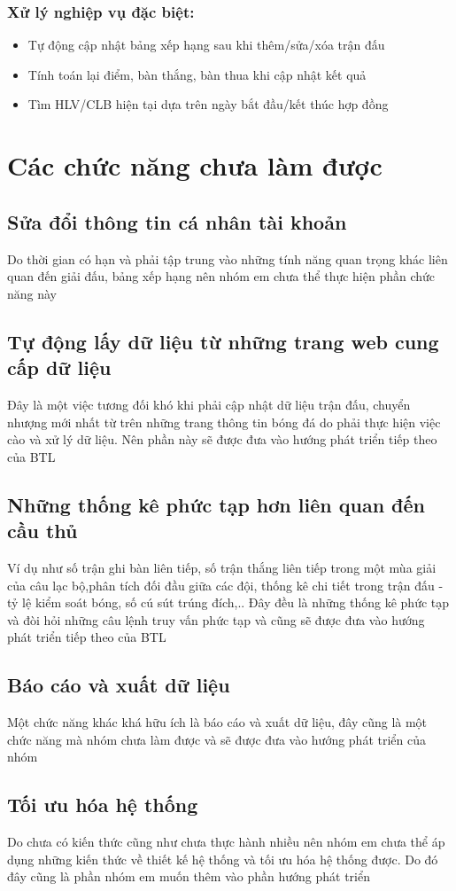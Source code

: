 \documentclass[../BTL.tex]{subfiles}
\begin{document}
\subsubsection{Xử lý nghiệp vụ đặc biệt:}
\begin{itemize}
    \item Tự động cập nhật bảng xếp hạng sau khi thêm/sửa/xóa trận đấu
    \item Tính toán lại điểm, bàn thắng, bàn thua khi cập nhật kết quả
    \item Tìm HLV/CLB hiện tại dựa trên ngày bắt đầu/kết thúc hợp đồng
\end{itemize}
\section{Các chức năng chưa làm được}
\subsection{Sửa đổi thông tin cá nhân tài khoản}
Do thời gian có hạn và phải tập trung vào những tính năng quan trọng khác liên quan đến giải đấu, bảng xếp hạng nên nhóm em chưa thể thực hiện phần chức năng này

\subsection{ Tự động lấy dữ liệu từ những trang web cung cấp dữ liệu}
Đây là một việc tương đối khó khi phải cập nhật dữ liệu trận đấu, chuyển nhượng mới nhất từ trên những trang thông tin bóng đá do phải thực hiện việc cào và xử lý dữ liệu. Nên phần này sẽ được đưa vào hướng phát triển tiếp theo của BTL

\subsection{ Những thống kê phức tạp hơn liên quan đến cầu thủ}
Ví dụ như số trận ghi bàn liên tiếp, số trận thắng liên tiếp trong một mùa giải của câu lạc bộ,phân tích đối đầu giữa các đội, thống kê chi tiết trong trận đấu - tỷ lệ kiểm soát bóng, số cú sút trúng đích,.. Đây đều là những thống kê phức tạp và đòi hỏi những câu lệnh truy vấn phức tạp và cũng sẽ được đưa vào hướng phát triển tiếp theo của BTL

\subsection{ Báo cáo và xuất dữ liệu}
Một chức năng khác khá hữu ích là báo cáo và xuất dữ liệu, đây cũng là một chức năng mà nhóm chưa làm được và sẽ được đưa vào hướng phát triển của nhóm

\subsection{ Tối ưu hóa hệ thống}
Do chưa có kiến thức cũng như chưa thực hành nhiều nên nhóm em chưa thể áp dụng những kiến thức về thiết kế hệ thống và tối ưu hóa hệ thống được. Do đó đây cũng là phần nhóm em muốn thêm vào phần hướng phát triển
\end{document}

